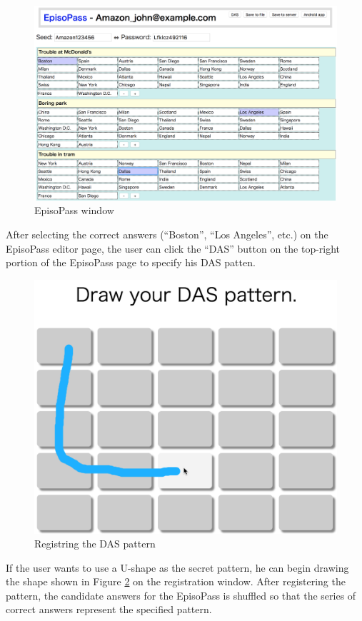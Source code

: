 \documentclass[sigconf]{acmart}
\begin{document}
\begin{figure}[H]
  \includegraphics[width=12cm,bb=0 0 1832 1180]{figures/JohnEpisodes.png}
  \caption{EpisoPass window}
  \label{JohnEpisodes}
\end{figure}

After selecting the correct answers
(``Boston'', ``Los Angeles'', etc.) on the EpisoPass editor page,
the user can click the ``DAS'' button on the top-right portion of the
EpisoPass page to specify his DAS patten.

\begin{figure}[H]
  \includegraphics[width=12cm,bb=0 0 1332 1118]{figures/DASRegister.png}
  \caption{Registring the DAS pattern}
  \label{DASRegister}
\end{figure}

If the user wants to use a U-shape as the secret pattern,
he can begin drawing the shape shown in Figure \ref{DASRegister}
on the registration window.
%
After registering the pattern, the candidate answers for the EpisoPass is
shuffled so that the series of correct answers represent the specified pattern.
\end{document}

